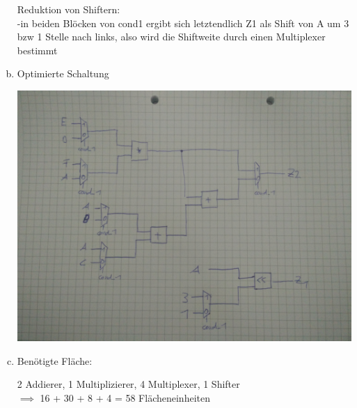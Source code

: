 \documentclass[a4paper]{scrartcl}
\begin{document}
\begin{enumerate}[(a)]
	Reduktion von Shiftern:\\
	-in beiden Blöcken von cond1 ergibt sich letztendlich Z1 als Shift von A um 3 bzw 1 Stelle nach links, also wird die Shiftweite durch einen Multiplexer bestimmt
	
	
	
	
	\item Optimierte Schaltung
	
	\includegraphics[width=\textwidth]{netlist_optimized}
	
	\item Benötigte Fläche:
	
	2 Addierer, 1 Multiplizierer, 4 Multiplexer, 1 Shifter\\
	$\implies$ 16 + 30 + 8 + 4 = 58 Flächeneinheiten
	
	\end{enumerate}

	
\end{document}
